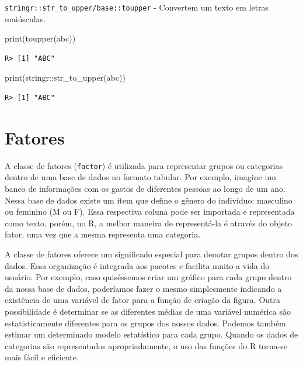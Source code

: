\documentclass[
  11pt,
]{book}
\newenvironment{Shaded}{\begin{snugshade}}{\end{snugshade}}
\newcommand{\FunctionTok}[1]{\textcolor[rgb]{0,0,0}{#1}}
\newcommand{\NormalTok}[1]{#1}
\newcommand{\SpecialCharTok}[1]{\textcolor[rgb]{0,0,0}{#1}}
\newcommand{\StringTok}[1]{\textcolor[rgb]{0.5,0.5,0.5}{#1}}
\begin{document}
\texttt{stringr::str\_to\_upper/base::toupper} - Convertem um texto em letras maiúsculas.

\begin{Shaded}
\begin{Highlighting}[]
\FunctionTok{print}\NormalTok{(}\FunctionTok{toupper}\NormalTok{(}\StringTok{\textquotesingle{}abc\textquotesingle{}}\NormalTok{))}
\end{Highlighting}
\end{Shaded}

\begin{verbatim}
R> [1] "ABC"
\end{verbatim}

\begin{Shaded}
\begin{Highlighting}[]
\FunctionTok{print}\NormalTok{(stringr}\SpecialCharTok{::}\FunctionTok{str\_to\_upper}\NormalTok{(}\StringTok{\textquotesingle{}abc\textquotesingle{}}\NormalTok{))}
\end{Highlighting}
\end{Shaded}

\begin{verbatim}
R> [1] "ABC"
\end{verbatim}

\hypertarget{fatores}{%
\section{Fatores}\label{fatores}}

A classe de fatores (\texttt{factor}) é utilizada para representar grupos ou categorias dentro de uma base de dados no formato tabular. Por exemplo, imagine um banco de informações com os gastos de diferentes pessoas ao longo de um ano. Nessa base de dados existe um item que define o gênero do indivíduo: masculino ou feminino (M ou F). Essa respectiva coluna pode ser importada e representada como texto, porém, no R, a melhor maneira de representá-la é através do objeto fator, uma vez que a mesma representa uma categoria.

A classe de fatores oferece um significado especial para denotar grupos dentro dos dados. Essa organização é integrada aos pacotes e facilita muito a vida do usuário. Por exemplo, caso quiséssemos criar um gráfico para cada grupo dentro da nossa base de dados, poderíamos fazer o mesmo simplesmente indicando a existência de uma variável de fator para a função de criação da figura. Outra possibilidade é determinar se as diferentes médias de uma variável numérica são estatisticamente diferentes para os grupos dos nossos dados. Podemos também estimar um determinado modelo estatístico para cada grupo. Quando os dados de categorias são representados apropriadamente, o uso das funções do R torna-se mais fácil e eficiente.
\end{document}
